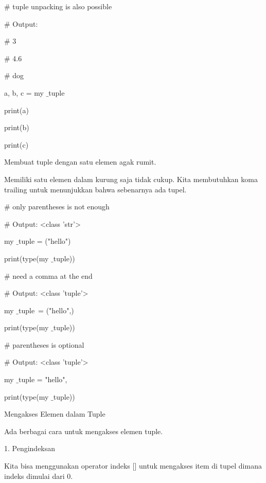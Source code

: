 \vspace{12pt}
 $  \#  $ tuple unpacking is also possible \par
 $  \#  $ Output: \par
 $  \#  $ 3 \par
 $  \#  $ 4.6 \par
 $  \#  $ dog \par
a, b, c = my $  \_  $tuple \par
print(a) \par
print(b) \par
print(c) \par
\vspace{12pt}
Membuat tuple dengan satu elemen agak rumit. \par
\vspace{12pt}
Memiliki satu elemen dalam kurung saja tidak cukup. Kita membutuhkan koma trailing untuk menunjukkan bahwa sebenarnya ada tupel. \par
\vspace{12pt}
 $  \#  $ only parentheses is not enough \par
 $  \#  $ Output: <class 'str'> \par
my $  \_  $tuple = ("hello") \par
print(type(my $  \_  $tuple)) \par
\vspace{12pt}
 $  \#  $ need a comma at the end \par
 $  \#  $ Output: <class 'tuple'> \par
my $  \_  $tuple~= ("hello",)   \par
print(type(my $  \_  $tuple)) \par
\vspace{12pt}
 $  \#  $ parentheses is optional \par
 $  \#  $ Output: <class 'tuple'> \par
my $  \_  $tuple = "hello", \par
print(type(my $  \_  $tuple)) \par
\vspace{12pt}
Mengakses Elemen dalam Tuple \par
\vspace{12pt}
Ada berbagai cara untuk mengakses elemen tuple. \par
1. Pengindeksan \par
\vspace{12pt}
Kita bisa menggunakan operator indeks [] untuk mengakses item di tupel dimana indeks dimulai dari 0. \par

